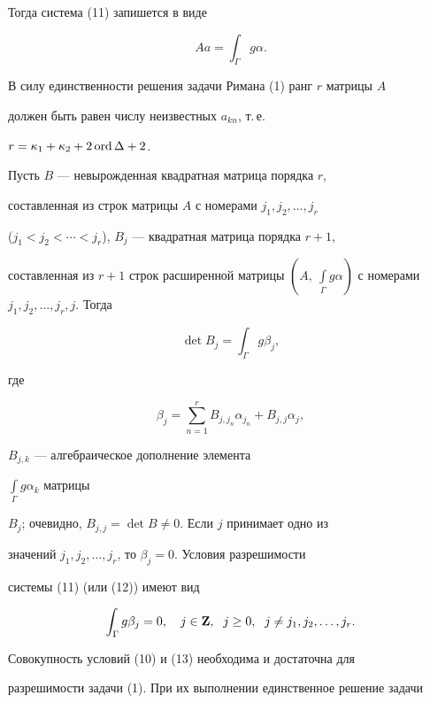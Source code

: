 Тогда система (11) запишется в виде


\begin{equation}


Aa=\int_\Gamma g\alpha.


\end{equation}


В силу единственности решения задачи Римана (1) ранг $r$ матрицы $A$


должен быть равен числу неизвестных $a_{kn}$, т.\,е.


$r=\kappa_1+\kappa_2+2\operatorname{ord}\Delta +2$.





Пусть $B$ --- невырожденная квадратная матрица порядка $r$,


составленная из строк матрицы $A$ с номерами $j_1, j_2,\dotsc, j_r$


($j_1<j_2<\dotsb <j_r$), $B_j$ --- квадратная матрица порядка $r+1$,


составленная из $r+1$ строк расширенной матрицы $(A,\ \int\limits_\Gamma


g\alpha)$ с номерами $j_1, j_2,\dotsc,j_r, j$. Тогда


$$


\det B_j=\int_\Gamma g\beta_j,


$$


где


$$


\beta_j=\sum_{n=1}^{r}B_{j,j_n}\alpha_{j_n} +B_{j,j}\alpha_j,


$$


$B_{j,k}$ --- алгебраическое дополнение элемента


$\int\limits_\Gamma g\alpha_k$ матрицы


$B_j$; очевидно, $B_{j,j}=\det B\ne 0$. Если $j$ принимает одно из


значений $j_1, j_2,\dotsc,j_r$, то $\beta_j=0$. Условия разрешимости


системы (11) (или (12)) имеют вид


\begin{equation}


\int_\Gamma g\beta_j=0,\quad j\in \bold Z,


\ \; j\ge 0,\ \; j\ne j_1,j_2,\dotsc, j_r.


\end{equation}


Совокупность условий (10) и (13) необходима и достаточна для


разрешимости задачи (1). При их выполнении единственное решение задачи



